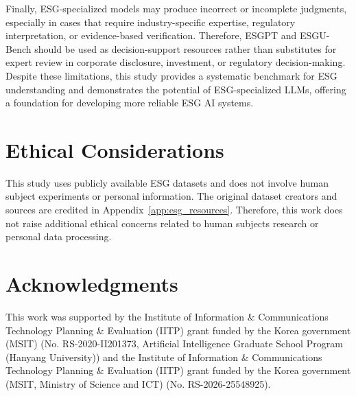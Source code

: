 \documentclass[11pt]{article}
\begin{document}
Finally, ESG-specialized models may produce incorrect or incomplete judgments, especially in cases that require industry-specific expertise, regulatory interpretation, or evidence-based verification. Therefore, \textsf{ESGPT} and \textsf{ESGU-Bench} should be used as decision-support resources rather than substitutes for expert review in corporate disclosure, investment, or regulatory decision-making. 
Despite these limitations, this study provides a systematic benchmark for ESG understanding and demonstrates the potential of ESG-specialized LLMs, offering a foundation for developing more reliable ESG AI systems.

\section*{Ethical Considerations}
This study uses publicly available ESG datasets and does not involve human subject experiments or personal information. The original dataset creators and sources are credited in Appendix~\ref{app:esg_resources}. Therefore, this work does not raise additional ethical concerns related to human subjects research or personal data processing.

\section*{Acknowledgments}
This work was supported by the Institute of Information \& Communications Technology Planning \& Evaluation (IITP) grant funded by the Korea government (MSIT) (No. RS-2020-II201373, Artificial Intelligence Graduate School Program (Hanyang University)) and the Institute of Information \& Communications Technology Planning \& Evaluation (IITP) grant funded by the Korea government (MSIT, Ministry of Science and ICT) (No. RS-2026-25548925).


\end{document}

